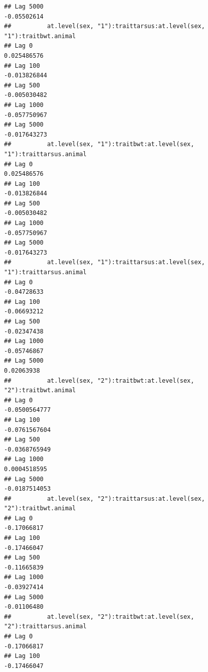 \documentclass[
  12pt,
]{book}
\begin{document}
\begin{verbatim}
## Lag 5000                                                    -0.05502614
##          at.level(sex, "1"):traittarsus:at.level(sex, "1"):traitbwt.animal
## Lag 0                                                          0.025486576
## Lag 100                                                       -0.013826844
## Lag 500                                                       -0.005030482
## Lag 1000                                                      -0.057750967
## Lag 5000                                                      -0.017643273
##          at.level(sex, "1"):traitbwt:at.level(sex, "1"):traittarsus.animal
## Lag 0                                                          0.025486576
## Lag 100                                                       -0.013826844
## Lag 500                                                       -0.005030482
## Lag 1000                                                      -0.057750967
## Lag 5000                                                      -0.017643273
##          at.level(sex, "1"):traittarsus:at.level(sex, "1"):traittarsus.animal
## Lag 0                                                             -0.04728633
## Lag 100                                                           -0.06693212
## Lag 500                                                           -0.02347438
## Lag 1000                                                          -0.05746867
## Lag 5000                                                           0.02063938
##          at.level(sex, "2"):traitbwt:at.level(sex, "2"):traitbwt.animal
## Lag 0                                                     -0.0500564777
## Lag 100                                                   -0.0761567604
## Lag 500                                                   -0.0368765949
## Lag 1000                                                   0.0004518595
## Lag 5000                                                  -0.0187514053
##          at.level(sex, "2"):traittarsus:at.level(sex, "2"):traitbwt.animal
## Lag 0                                                          -0.17066817
## Lag 100                                                        -0.17466047
## Lag 500                                                        -0.11665839
## Lag 1000                                                       -0.03927414
## Lag 5000                                                       -0.01106480
##          at.level(sex, "2"):traitbwt:at.level(sex, "2"):traittarsus.animal
## Lag 0                                                          -0.17066817
## Lag 100                                                        -0.17466047

\end{verbatim}
\end{document}
